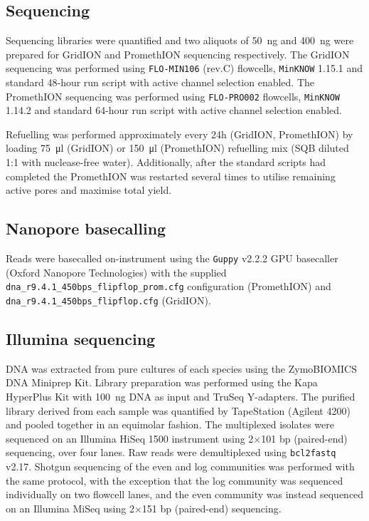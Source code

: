 \documentclass[a4paper,num-refs]{oup-contemporary}
\begin{document}
\subsection{Sequencing}

Sequencing libraries were quantified and two aliquots of \SI{50}{\nano\gram} and \SI{400}{\nano\gram} were prepared for GridION and PromethION sequencing respectively. The GridION sequencing was performed using \texttt{FLO-MIN106} (rev.C) flowcells, \texttt{MinKNOW} 1.15.1 and standard 48-hour run script with active channel selection enabled. The PromethION sequencing was performed using \texttt{FLO-PRO002} flowcells, \texttt{MinKNOW} 1.14.2 and standard 64-hour run script with active channel selection enabled.

Refuelling was performed approximately every 24h (GridION, PromethION) by loading \SI{75}{\micro\litre} (GridION) or \SI{150}{\micro\litre} (PromethION) refuelling mix (SQB diluted 1:1 with nuclease-free water). Additionally, after the standard scripts had completed the PromethION was restarted several times to utilise remaining active pores and maximise total yield.

\subsection{Nanopore basecalling}
Reads were basecalled on-instrument using the \texttt{Guppy} v2.2.2 GPU basecaller (Oxford Nanopore Technologies) with the supplied \texttt{dna\_r9.4.1\_450bps\_flipflop\_prom.cfg} configuration (PromethION) and \texttt{dna\_r9.4.1\_450bps\_flipflop.cfg} (GridION).








\subsection{Illumina sequencing}

DNA was extracted from pure cultures of each species using the ZymoBIOMICS DNA Miniprep Kit. Library preparation was performed using the Kapa HyperPlus Kit with \SI{100}{\nano\gram} DNA as input and TruSeq Y-adapters. The purified library derived from each sample was quantified by TapeStation (Agilent 4200) and pooled together in an equimolar fashion. The multiplexed isolates were sequenced on an Illumina HiSeq 1500 instrument using 2$\times$101 bp (paired-end) sequencing, over four lanes. Raw reads were demultiplexed using \texttt{bcl2fastq} v2.17.
Shotgun sequencing of the even and log communities was performed with the same protocol, with the exception that the log community was sequenced individually on two flowcell lanes, and the even community was instead sequenced on an Illumina MiSeq using 2$\times$151 bp (paired-end) sequencing.
\end{document}
